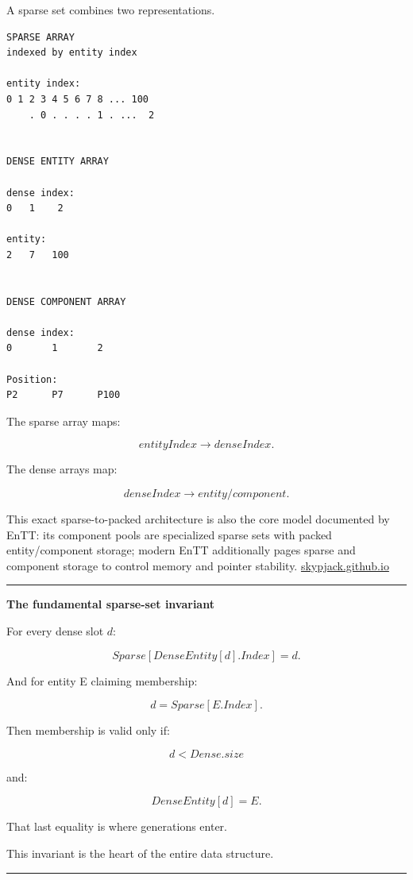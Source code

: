 A sparse set combines two representations.

\begin{verbatim}
SPARSE ARRAY
indexed by entity index

entity index:
0 1 2 3 4 5 6 7 8 ... 100
    . 0 . . . . 1 . ...  2


DENSE ENTITY ARRAY

dense index:
0   1    2

entity:
2   7   100


DENSE COMPONENT ARRAY

dense index:
0       1       2

Position:
P2      P7      P100
\end{verbatim}

The sparse array maps:

\[
entityIndex\rightarrow denseIndex.
\]

The dense arrays map:

\[
denseIndex\rightarrow entity/component.
\]

This exact sparse-to-packed architecture is also the core model documented by EnTT: its component pools are specialized sparse sets with packed entity/component storage; modern EnTT additionally pages sparse and component storage to control memory and pointer stability. \href{https://skypjack.github.io/entt/md_docs_2md_2entity.html?utm_source=chatgpt.com}{skypjack.github.io}

\begin{center}\rule{0.5\linewidth}{0.5pt}\end{center}

\textbf{The fundamental sparse-set invariant}

For every dense slot \(d\):

\[
\boxed{
Sparse[DenseEntity[d].Index]=d.
}
\]

And for entity E claiming membership:

\[
d=Sparse[E.Index].
\]

Then membership is valid only if:

\[
d<Dense.size
\]

and:

\[
DenseEntity[d]=E.
\]

That last equality is where generations enter.

This invariant is the heart of the entire data structure.

\begin{center}\rule{0.5\linewidth}{0.5pt}\end{center}

